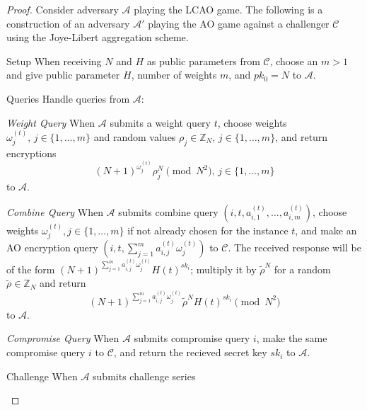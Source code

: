 \documentclass[10pt,letterpaper,oneside,twocolumn,journal]{IEEEtran}
\theoremstyle{definition}
\theoremstyle{definition}
\theoremstyle{remark}
\begin{document}
\begin{proof}
    Consider adversary $\mathcal{A}$ playing the LCAO game. The following is a construction of an adversary $\mathcal{A}'$ playing the AO game \cite{shiPrivacyPreservingAggregationTimeSeries2011} against a challenger $\mathcal{C}$ using the Joye-Libert aggregation scheme.
    \begin{LaTeXdescription}
        \item[Setup] When receiving $N$ and $H$ as public parameters from $\mathcal{C}$, choose an $m>1$ and give public parameter $H$, number of weights $m$, and $pk_0=N$ to $\mathcal{A}$.
        \item[Queries] Handle queries from $\mathcal{A}$:
        \begin{LaTeXdescription}
            \item[\textit{Weight Query}] When $\mathcal{A}$ submits a weight query $t$, choose weights $\omega^{(t)}_j,\,j\in\{1,\dots,m\}$ and random values $\rho_j \in \mathbb{Z}_N,\,j\in\{1,\dots,m\}$, and return encryptions 
            \begin{equation*}
                (N+1)^{\omega^{(t)}_{j}}\rho_j^N\pmod{N^2},\,j\in\{1,\dots,m\}
            \end{equation*}
            to $\mathcal{A}$.
            \item[\textit{Combine Query}] When $\mathcal{A}$ submits combine query $(i, t, a^{(t)}_{i,1},\dots,a^{(t)}_{i,m})$, choose weights $\omega^{(t)}_j,j\in\{1,\dots,m\}$ if not already chosen for the instance $t$, and make an AO encryption query $(i, t, \sum^m_{j=1}a^{(t)}_{i,j}\omega^{(t)}_j)$ to $\mathcal{C}$. The received response will be of the form $(N+1)^{\sum^m_{j=1}a^{(t)}_{i,j}\omega^{(t)}_j}H(t)^{sk_i}$; multiply it by $\tilde{\rho}^N$ for a random $\tilde{\rho} \in \mathbb{Z}_N$ and return 
            \begin{equation*}
                (N+1)^{\sum^m_{j=1}a^{(t)}_{i,j}\omega^{(t)}_j}\tilde{\rho}^N H(t)^{sk_i} \pmod{N^2}
            \end{equation*}
            to $\mathcal{A}$.
            \item[\textit{Compromise Query}] When $\mathcal{A}$ submits compromise query $i$, make the same compromise query $i$ to $\mathcal{C}$, and return the recieved secret key $sk_i$ to $\mathcal{A}$.
        \end{LaTeXdescription}
        \item[Challenge] When $\mathcal{A}$ submits challenge series
        \begin{equation*}

\end{equation*}
\end{LaTeXdescription}
\end{proof}
\end{document}
